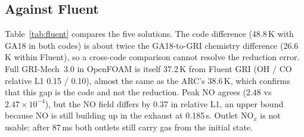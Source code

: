 \documentclass[preprint,review,12pt]{elsarticle}
\begin{document}
\subsection{Against Fluent}
Table~\ref{tab:fluent} compares the five solutions. The code difference (48.8\,K with GA18 in both codes) is about
twice the GA18-to-GRI chemistry difference (26.6\,K within Fluent), so a cross-code comparison cannot resolve the
reduction error. Full GRI-Mech~3.0 in OpenFOAM is itself 37.2\,K from Fluent GRI (OH / CO relative L1 0.15 / 0.10),
almost the same as the ARC's 38.6\,K, which confirms that this gap is the code and not the reduction. Peak NO agrees ($2.48$ vs $2.47\times10^{-4}$), but the NO field differs by 0.37 in relative L1, an
upper bound because NO is still building up in the exhaust at 0.185\,s. Outlet NO$_x$ is not usable: after 87\,ms both
outlets still carry gas from the initial state.
\end{document}
